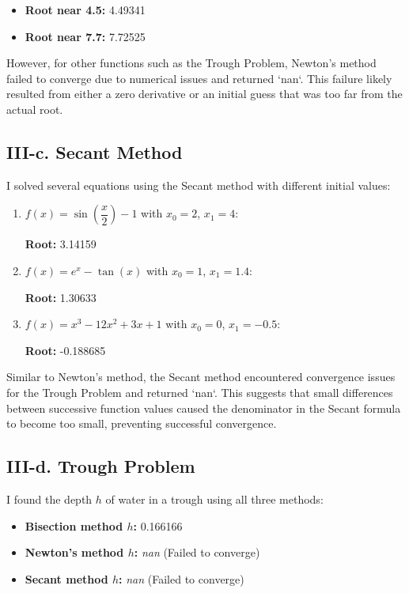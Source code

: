 \documentclass[a4paper]{article}
\begin{document}
\begin{itemize}
    \item \textbf{Root near 4.5:} 4.49341
    \item \textbf{Root near 7.7:} 7.72525
\end{itemize}

However, for other functions such as the Trough Problem, Newton's method failed to converge due to numerical issues and returned `nan`. This failure likely resulted from either a zero derivative or an initial guess that was too far from the actual root.

\subsection*{III-c. Secant Method}

I solved several equations using the Secant method with different initial values:

\begin{enumerate}
    \item $f(x) = \sin\left(\dfrac{x}{2}\right) - 1$ with $x_0 = 2$, $x_1 = 4$:

    \textbf{Root:} 3.14159

    \item $f(x) = e^{x} - \tan(x)$ with $x_0 = 1$, $x_1 = 1.4$:

    \textbf{Root:} 1.30633

    \item $f(x) = x^3 - 12x^2 + 3x + 1$ with $x_0 = 0$, $x_1 = -0.5$:

    \textbf{Root:} -0.188685
\end{enumerate}

Similar to Newton's method, the Secant method encountered convergence issues for the Trough Problem and returned `nan`. This suggests that small differences between successive function values caused the denominator in the Secant formula to become too small, preventing successful convergence.

\subsection*{III-d. Trough Problem}

I found the depth $h$ of water in a trough using all three methods:

\begin{itemize}
    \item \textbf{Bisection method $h$:} 0.166166
    \item \textbf{Newton's method $h$:} \textit{nan} (Failed to converge)
    \item \textbf{Secant method $h$:} \textit{nan} (Failed to converge)
\end{itemize}
\end{document}
